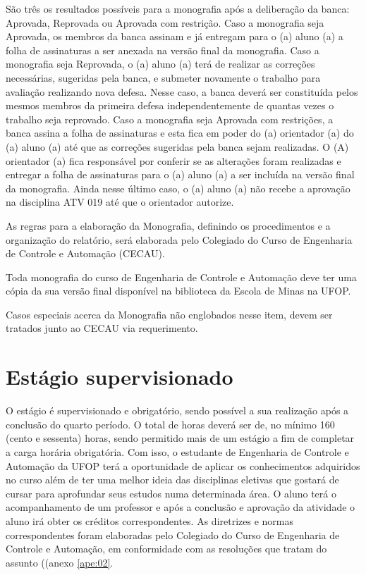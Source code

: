 São três os resultados possíveis para a monografia após a deliberação da banca: Aprovada, Reprovada ou Aprovada com restrição. Caso a monografia seja Aprovada, os membros da banca assinam e já entregam para o (a) aluno (a) a folha de assinaturas a ser anexada na versão final da monografia. Caso a monografia seja Reprovada, o (a) aluno (a) terá de realizar as correções necessárias, sugeridas pela banca, e submeter novamente o trabalho para avaliação realizando nova defesa. Nesse caso, a banca deverá ser constituída pelos mesmos membros da primeira defesa independentemente de quantas vezes o trabalho seja reprovado. Caso a monografia seja Aprovada com restrições, a banca assina a folha de assinaturas e esta fica em poder do (a) orientador (a) do (a) aluno (a) até que as correções sugeridas pela banca sejam realizadas. O (A) orientador (a) fica responsável por conferir se as alterações foram realizadas e entregar a folha de assinaturas para o (a) aluno (a) a ser incluída na versão final da monografia. Ainda nesse último caso, o (a) aluno (a) não recebe a aprovação na disciplina ATV 019 até que o orientador autorize.

As regras para a elaboração da Monografia, definindo os procedimentos e a organização do relatório, será elaborada pelo Colegiado do Curso de Engenharia de Controle e Automação (CECAU).

Toda monografia do curso de Engenharia de Controle e Automação deve ter uma cópia da sua versão final disponível na biblioteca da Escola de Minas na UFOP.

Casos especiais acerca da Monografia não englobados nesse item, devem ser tratados junto ao CECAU via requerimento. 

\section{Estágio supervisionado}
O estágio é supervisionado e obrigatório, sendo possível a sua realização após a conclusão do quarto período. O total de horas deverá ser de, no mínimo 160 (cento e sessenta) horas, sendo permitido mais de um estágio a fim de completar a carga horária obrigatória.  Com isso, o estudante de Engenharia de Controle e Automação da UFOP terá a oportunidade de aplicar os conhecimentos adquiridos no curso além de ter uma melhor ideia das disciplinas eletivas que gostará de cursar para aprofundar seus estudos numa determinada área. O aluno terá o acompanhamento de um professor e após a conclusão e aprovação da atividade o aluno irá obter os créditos correspondentes. As diretrizes e normas correspondentes foram elaboradas pelo Colegiado do Curso de Engenharia de Controle e Automação, em conformidade com as resoluções que tratam do assunto ((anexo \ref{ape:02}.

